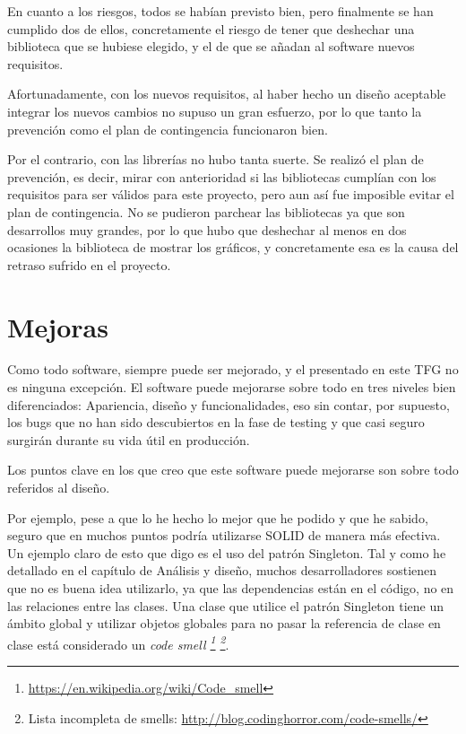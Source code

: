 En cuanto a los riesgos, todos se hab\'ian previsto bien, pero finalmente se han cumplido dos
de ellos, concretamente el riesgo de tener que deshechar una biblioteca que se hubiese elegido,
y el de que se a\~nadan al software nuevos requisitos.

Afortunadamente, con los nuevos requisitos, al haber hecho un dise\~no aceptable integrar
los nuevos cambios no supuso un gran esfuerzo, por lo que tanto la prevenci\'on como
el plan de contingencia funcionaron bien.

Por el contrario, con las librer\'ias no hubo tanta suerte. Se realiz\'o el plan 
de prevenci\'on, es decir, mirar con anterioridad si las bibliotecas cumpl\'ian con
los requisitos para ser v\'alidos para este proyecto, pero aun as\'i fue imposible
evitar el plan de contingencia. No se pudieron parchear las bibliotecas ya que son
desarrollos muy grandes, por lo que hubo que deshechar al menos en dos ocasiones
la biblioteca de mostrar los gr\'aficos, y concretamente esa es la causa
del retraso sufrido en el proyecto.

\section{Mejoras}
Como todo software, siempre puede ser mejorado, y el presentado en este
TFG no es ninguna excepci\'on. El software puede mejorarse sobre todo en tres niveles 
bien diferenciados: Apariencia, dise\~no y funcionalidades, eso sin contar, por
supuesto, los bugs que no han sido descubiertos en la fase de testing y que
casi seguro surgir\'an durante su vida \'util en producci\'on.

Los puntos clave en los que creo que este software puede mejorarse son sobre todo
referidos al dise\~no.

Por ejemplo, pese a que lo he hecho lo mejor que he podido y que he sabido,
seguro que en muchos puntos podr\'ia utilizarse SOLID de manera m\'as efectiva. Un
ejemplo claro de esto que digo es el uso del patr\'on Singleton. Tal y como he detallado
en el cap\'itulo de An\'alisis y dise\~no, muchos desarrolladores sostienen
que no es buena idea utilizarlo, ya que las dependencias est\'an en el c\'odigo,
no en las relaciones entre las clases. Una clase que utilice el patr\'on Singleton tiene
un \'ambito global y utilizar objetos globales para
no pasar la referencia de clase en clase est\'a considerado un 
\emph{code smell \footnote{\url{https://en.wikipedia.org/wiki/Code_smell}}
    \footnote{Lista incompleta de smells: \url{http://blog.codinghorror.com/code-smells/}}}.

